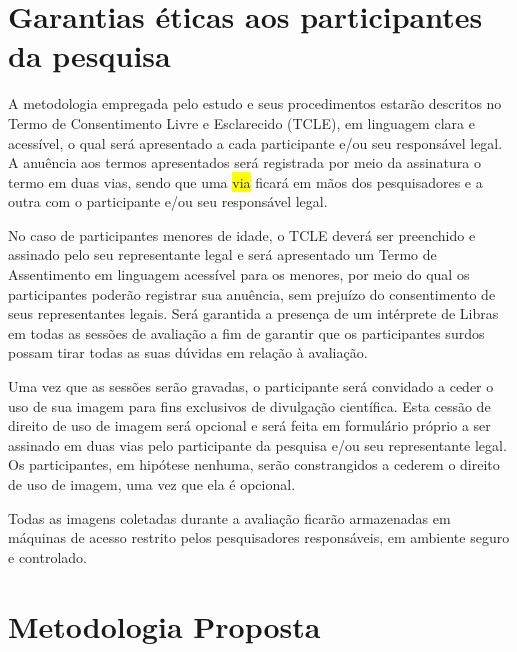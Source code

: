 \documentclass[a4paper,11pt,titlepage,singlespacing]{article}
\begin{document}
\section{Garantias éticas aos participantes da pesquisa}
A metodologia empregada pelo estudo e seus procedimentos estarão descritos no Termo de Consentimento Livre e Esclarecido (TCLE), em linguagem clara e acessível, o qual será apresentado a cada participante e/ou seu responsável legal. A anuência aos termos apresentados será registrada por meio da assinatura o termo em duas vias, sendo que uma \colorbox{yellow}{via}
ficará em mãos dos pesquisadores e a outra com o participante e/ou seu responsável legal.

No caso de participantes menores de idade, o TCLE deverá ser preenchido e assinado pelo seu representante legal e será apresentado um Termo de Assentimento em linguagem acessível para os menores, por meio do qual os participantes poderão registrar sua anuência, sem prejuízo do consentimento de seus representantes legais.
Será garantida a presença de um intérprete de Libras em todas as sessões de avaliação a fim de garantir que os participantes surdos possam tirar todas as suas dúvidas em relação à avaliação.

Uma vez que as sessões serão gravadas, o participante será convidado a ceder o uso de sua imagem para fins exclusivos de divulgação científica. Esta cessão de direito de uso de imagem será opcional e será feita em formulário próprio a ser assinado em duas vias pelo participante da pesquisa e/ou seu representante legal. Os participantes, em hipótese nenhuma, serão constrangidos a cederem o direito de uso de imagem, uma vez que ela é opcional.

Todas as imagens coletadas durante a avaliação ficarão armazenadas em máquinas de acesso restrito pelos pesquisadores responsáveis, em ambiente seguro e controlado.




\section{Metodologia Proposta}
\end{document}
